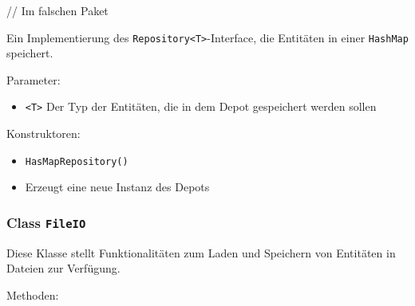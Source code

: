 \documentclass[parskip=full,11pt]{scrartcl}
\begin{document}
// Im falschen Paket

Ein Implementierung des \texttt{Repository<T>}-Interface, die Entitäten in einer \texttt{HashMap} speichert.

Parameter:

\begin{itemize}\itemsep -10pt
	\item \texttt{<T>} Der Typ der Entitäten, die in dem Depot gespeichert werden sollen
\end{itemize}

Konstruktoren:

\begin{itemize} \itemsep -10pt
	\item \texttt{HasMapRepository()}
	\item[] Erzeugt eine neue Instanz des Depots
\end{itemize}


\subsubsection{Class \texttt{FileIO}}

Diese Klasse stellt Funktionalitäten zum Laden und Speichern von Entitäten in Dateien zur Verfügung.

Methoden:
\end{document}
